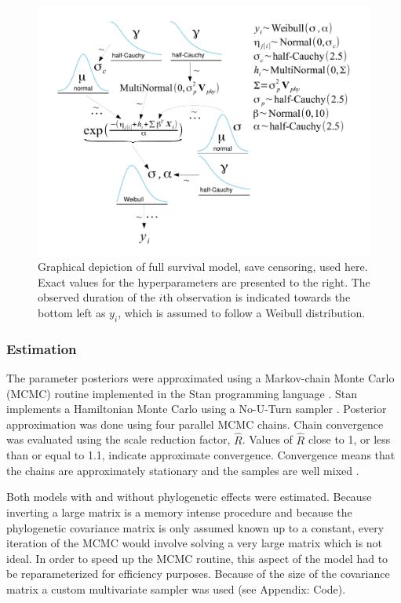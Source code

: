 \documentclass[12pt,letterpaper]{article}
\begin{document}
\begin{figure}
  \centering
  \includegraphics[height = 0.5\textheight, width = \textwidth, keepaspectratio = true]{figure/mammal_survival_model}
  \caption{Graphical depiction of full survival model, save censoring, used here. Exact values for the hyperparameters are presented to the right. The observed duration of the \(i\)th observation is indicated towards the bottom left as \(y_{i}\), which is assumed to follow a Weibull distribution.}
  \label{fig:model_diagram}
\end{figure}


\subsubsection{Estimation}
The parameter posteriors were approximated using a Markov-chain Monte Carlo (MCMC) routine implemented in the Stan programming language \citep{2014stan}. Stan implements a Hamiltonian Monte Carlo using a No-U-Turn sampler \citep{Hoffman-Gelman:2011}. Posterior approximation was done using four parallel MCMC chains. Chain convergence was evaluated using the scale reduction factor, \(\hat{R}\). Values of \(\hat{R}\) close to 1, or less than or equal to 1.1, indicate approximate convergence. Convergence means that the chains are approximately stationary and the samples are well mixed \citep{Gelman2013d}.

Both models with and without phylogenetic effects were estimated. Because inverting a large matrix is a memory intense procedure and because the phylogenetic covariance matrix is only assumed known up to a constant, every iteration of the MCMC would involve solving a very large matrix which is not ideal. In order to speed up the MCMC routine, this aspect of the model had to be reparameterized for efficiency purposes. Because of the size of the covariance matrix a custom multivariate sampler was used (see Appendix: Code).
\end{document}
